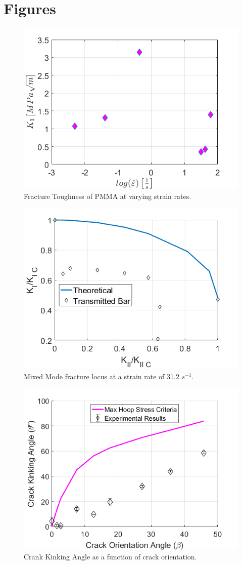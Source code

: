 \documentclass[12pt]{article}
\begin{document}
\section{Figures} %

\begin{figure}[H]
	\centering
	\includegraphics[width=.67\textwidth,scale=1]{Goal1_b.png}
	\caption{Fracture Toughness of PMMA at varying strain rates.}
	\label{fig:Goal1}
\end{figure}

\begin{figure}[H]
	\centering
	\includegraphics[width=.67\textwidth,scale=1]{Goal2.png}
	\caption{Mixed Mode fracture locus at a strain rate of 31.2 $s^{-1}$.}
	\label{fig:Goal2}
\end{figure}

\begin{figure}[H]
	\centering
	\includegraphics[width=.67\textwidth,scale=1]{Goal3_b.png}
	\caption{Crank Kinking Angle as a function of crack orientation.}
	\label{fig:Goal3}
\end{figure}




\end{document}
